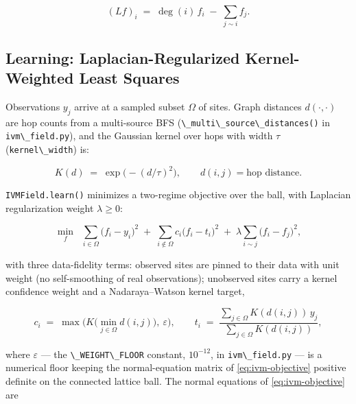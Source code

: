 \documentclass[
  10pt,
]{article}
\newcommand{\passthrough}[1]{#1}
\begin{document}
\begin{equation}
\label{eq:ivm-laplacian}
(L f)_i \;=\; \deg(i)\, f_i \;-\; \sum_{j \sim i} f_j .
\end{equation}

\subsection{Learning: Laplacian-Regularized Kernel-Weighted Least
Squares}\label{learning-laplacian-regularized-kernel-weighted-least-squares}

Observations \(y_j\) arrive at a sampled subset \(\Omega\) of sites.
Graph distances \(d(\cdot,\cdot)\) are hop counts from a multi-source
BFS (\passthrough{\lstinline!\_multi\_source\_distances()!} in
\passthrough{\lstinline!ivm\_field.py!}), and the Gaussian kernel over
hops with width \(\tau\) (\passthrough{\lstinline!kernel\_width!}) is:

\begin{equation}
\label{eq:ivm-kernel}
K(d) \;=\; \exp\!\bigl( -(d/\tau)^2 \bigr), \qquad d(i,j) = \text{hop distance}.
\end{equation}

\passthrough{\lstinline!IVMField.learn()!} minimizes a two-regime
objective over the ball, with Laplacian regularization weight
\(\lambda \geq 0\):

\begin{equation}
\label{eq:ivm-objective}
\min_{f} \;\; \sum_{i \in \Omega} \bigl( f_i - y_i \bigr)^2
\;+\; \sum_{i \notin \Omega} c_i \bigl( f_i - t_i \bigr)^2
\;+\; \lambda \sum_{i \sim j} \bigl( f_i - f_j \bigr)^2 ,
\end{equation}

with three data-fidelity terms: observed sites are pinned to their data
with unit weight (no self-smoothing of real observations); unobserved
sites carry a kernel confidence weight and a Nadaraya--Watson kernel
target,

\begin{equation}
\label{eq:ivm-confidence}
c_i \;=\; \max\bigl( K\bigl(\min_{j \in \Omega} d(i,j)\bigr),\ \varepsilon \bigr),
\qquad
t_i \;=\; \frac{\sum_{j \in \Omega} K(d(i,j))\, y_j}{\sum_{j \in \Omega} K(d(i,j))},
\end{equation}

where \(\varepsilon\) --- the \passthrough{\lstinline!\_WEIGHT\_FLOOR!}
constant, \(10^{-12}\), in \passthrough{\lstinline!ivm\_field.py!} ---
is a numerical floor keeping the normal-equation matrix of
\eqref{eq:ivm-objective} positive definite on the connected lattice
ball. The normal equations of \eqref{eq:ivm-objective} are
\end{document}
